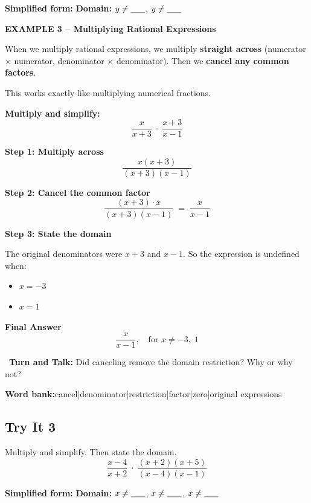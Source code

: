 \documentclass[11pt]{article}
\newcommand{\blk}[1][1.2cm]{\underline{\hspace{#1}}}
\newcommand{\examplehead}[1]{%
  \vspace{6pt}%
  \noindent\colorbox{hlcyan}{\parbox{\dimexpr\linewidth-2\fboxsep}{\textbf{#1}}}%
  \vspace{2pt}%
}
\newcommand{\turnandtalk}[1]{%
  \vspace{3pt}%
  \noindent\textbullet~\textbf{Turn and Talk:} #1\par%
}
\begin{document}
\noindent\textbf{Simplified form:}\; \blk[5cm]
\hfill\textbf{Domain:}\; $y\neq \blk[0.6cm]$,\; $y\neq \blk[0.6cm]$

\examplehead{EXAMPLE 3 -- Multiplying Rational Expressions}

\noindent When we multiply rational expressions, we multiply
\textbf{straight across} (numerator $\times$ numerator, denominator
$\times$ denominator).  Then we \textbf{cancel any common factors}.

\noindent This works exactly like multiplying numerical fractions.

\noindent\textbf{Multiply and simplify:}
\[
  \frac{x}{x+3}\;\cdot\;\frac{x+3}{x-1}
\]

\noindent\textbf{Step 1:\; Multiply across}
\[
  \frac{x(x+3)}{(x+3)(x-1)}
\]

\noindent\textbf{Step 2:\; Cancel the common factor}
\[
  \frac{\boxed{(x+3)}\cdot x}{\boxed{(x+3)}(x-1)} \;=\; \frac{x}{x-1}
\]

\noindent\textbf{Step 3:\; State the domain}\par
The original denominators were $x+3$ and $x-1$.  So the expression is
undefined when:
\begin{itemize}[leftmargin=1.5em,itemsep=1pt,topsep=2pt]
  \item $x = -3$
  \item $x = 1$
\end{itemize}

\noindent\textbf{Final Answer}
\[
  \frac{x}{x-1},\quad \text{for } x\neq -3,\;1
\]

\turnandtalk{Did canceling remove the domain restriction?  Why or why not?}

\begin{frames}
  \textbf{Word bank:}\quad cancel\quad|\quad denominator\quad|\quad restriction\quad|\quad factor\quad|\quad zero\quad|\quad original expressions
\end{frames}

\subsection*{Try It 3}
\noindent Multiply and simplify.  Then state the domain.
\[
  \frac{x-4}{x+2}\;\cdot\;\frac{(x+2)(x+5)}{(x-4)(x-1)}
\]

\noindent\textbf{Simplified form:}\; \blk[5cm]
\hfill\textbf{Domain:}\; $x\neq \blk[0.6cm]$,\; $x\neq \blk[0.6cm]$,\; $x\neq \blk[0.6cm]$
\end{document}
